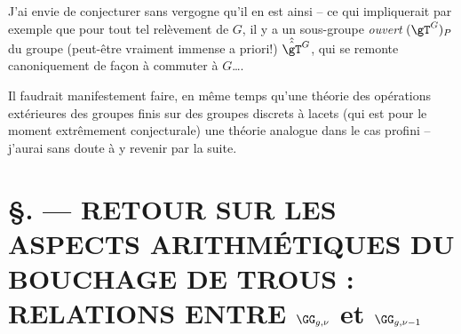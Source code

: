 J'ai envie de conjecturer sans vergogne qu'il en est ainsi -- ce
qui impliquerait par exemple que pour tout tel relèvement de $G$, il y a un 
sous-groupe {\it ouvert} $(\gT^G)_P$ du groupe 
(peut-être vraiment immense a priori!) $\hat{\hat\gT}^G$, qui se remonte 
canoniquement de fa\c con à commuter à $G$\dots.

Il faudrait manifestement faire, en même temps qu'une théorie
des opérations extérieures des groupes finis sur des groupes discrets
à lacets (qui est pour le moment extrêmement conjecturale)
une théorie analogue dans le cas profini -- j'aurai sans doute à y
revenir par la suite.















\chapter*{\S {}. --- RETOUR SUR LES ASPECTS ARITHMÉTIQUES DU BOUCHAGE DE TROUS : RELATIONS ENTRE $\GG_{g,\nu}$ et $\GG_{g,\nu-1}$}\thispagestyle{empty}
\label{sec:1}
\section*{}


